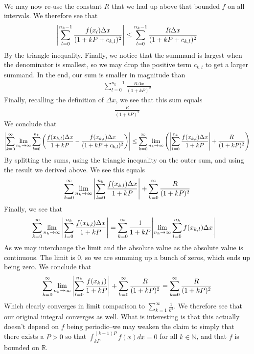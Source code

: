 \documentclass[12pt]{article}
\def\mbb#1{\mathbb{#1}}
\def\bN{\mbb{N}}
\theoremstyle{definition}
\theoremstyle{remark}
\newcommand{\R}{\mathbb{R}}
\begin{document}
\begin{enumerate}[leftmargin=\labelsep]
\begin{align*}
		\end{align*}
		We may now re-use the constant $R$ that we had up above that bounded $f$ on all intervals. We therefore see that 
		\begin{align*}
			\qty|\sum_{l=0}^{n_k-1} \frac{f(x_l)\Delta x}{(1+kP+c_{k,l})^2}| \leq \sum_{l=0}^{n_k-1} \frac{R\Delta x}{(1+kP+c_{k,l})^2}
		\end{align*}
		By the triangle inequality. Finally, we notice that the summand is largest when the denominator is smallest, so we may drop the positive term $c_{k,l}$ to get a larger summand. In the end, our sum is smaller in magnitude than
		\begin{align*}
			\sum_{l=0}^{n_k-1} \frac{R\Delta x}{(1+kP)^2}
		\end{align*}
		Finally, recalling the definition of  $\Delta x$, we see that this sum equals 
		\begin{align*}
			\frac{R}{(1+kP)^2}
		\end{align*}
		We conclude that
		\begin{align*}
			\qty|\sum_{k=0}^{\infty} \lim_{n_k \to \infty} \sum_{l=0}^{n_k} \qty(\frac{f(x_{k,l})\Delta x}{1+kP} - \frac{f(x_{k,l})\Delta x}{(1+kP+c_{k,l})^2})| \leq \sum_{k=0}^{\infty} \lim_{n_k \to \infty} \qty(\qty|\sum_{l=0}^{n_k} \frac{f(x_{k,l})\Delta x}{1+kP}| + \frac{R}{(1+kP)^2})
		\end{align*}
		By splitting the sums, using the triangle inequality on the outer sum, and using the result we derived above. We see this equals
		\begin{align*}
			\sum_{k=0}^{\infty} \lim_{n_k \to \infty} \qty|\sum_{l=0}^{n_k} \frac{f(x_{k,l})\Delta x}{1+kP}| + \sum_{k=0}^{\infty} \frac{R}{(1+kP)^2}
		\end{align*}
		Finally, we see that
		\begin{align*}
			\sum_{k=0}^{\infty} \lim_{n_k \to \infty} \qty|\sum_{l=0}^{n_k} \frac{f(x_{k,l})\Delta x}{1+kP}| &= \sum_{k=0}^{\infty} \frac{1}{1+kP} \qty|\lim_{n_k \to \infty} \sum_{l=0}^{n_k} f(x_{k,l})\Delta x|
		\end{align*}
		As we may interchange the limit and the absolute value as the absolute value is continuous. The limit is 0, so we are summing up a bunch of zeros, which ends up being zero. We conclude that
		\begin{align*}
			\sum_{k=0}^{\infty} \lim_{n_k \to \infty} \qty|\sum_{l=0}^{n_k} \frac{f(x_{k,l})}{1+kP}| + \sum_{k=0}^{\infty} \frac{R}{(1+kP)^2} = \sum_{k=0}^{\infty} \frac{R}{(1+kP)^2}
		\end{align*}
		Which clearly converges in limit comparison to $\sum_{k=1}^{\infty} \frac1{k^2}$. We therefore see that our original integral converges as well. What is interesting is that this actually doesn't depend on $f$ being periodic--we may weaken the claim to simply that there exists a $P > 0$ so that $\int_{kP}^{(k+1)P} f(x)dx = 0$ for all $k \in \bN$, and that $f$ is bounded on $\R$.
		

\end{enumerate}
\end{document}
